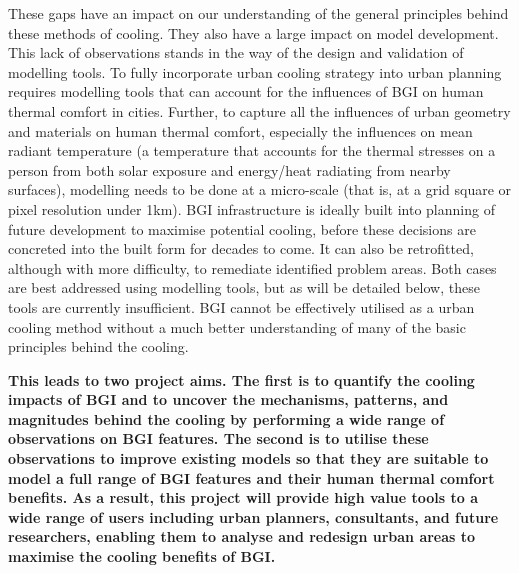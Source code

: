 These gaps have an impact on our understanding of the general principles behind these methods of cooling. They also have a large impact on model development. This lack of observations stands in the way of the design and validation of modelling tools. To fully incorporate urban cooling strategy into urban planning requires modelling tools that can account for the influences of BGI on human thermal comfort in cities. Further, to capture all the influences of urban geometry and materials on human thermal comfort, especially the influences on mean radiant temperature\cite{Kantor2011} (a temperature that accounts for the thermal stresses on a person from both solar exposure and energy/heat radiating from nearby surfaces), modelling needs to be done at a micro-scale (that is, at a grid square or pixel resolution under 1km). BGI infrastructure is ideally built into planning of future development to maximise potential cooling, before these decisions are concreted into the built form for decades to come. It can also be retrofitted, although with more difficulty, to remediate identified problem areas. Both cases are best addressed using modelling tools, but as will be detailed below, these tools are currently insufficient. BGI cannot be effectively utilised as a urban cooling method without a much better understanding of many of the basic principles behind the cooling. 

\textbf{This leads to two project aims. The first is to quantify the cooling impacts of BGI and to uncover the mechanisms, patterns, and magnitudes behind the cooling by performing a wide range of observations on BGI features. The second is to utilise these observations to improve existing models so that they are suitable to model a full range of BGI features and their human thermal comfort benefits. As a result, this project will provide high value tools to a wide range of users including urban planners, consultants, and future researchers, enabling them to analyse and redesign urban areas to maximise the cooling benefits of BGI.}


